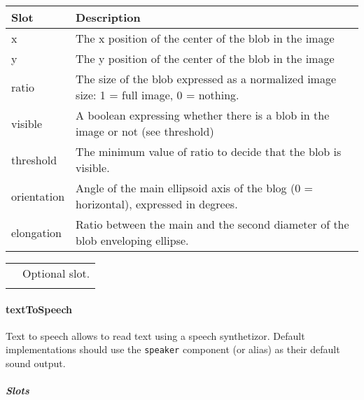 \documentclass[a4paper]{article}
\begin{document}
\begin{flushleft}
\tablehead{}
\begin{supertabular}{|m{3.293cm}|m{11.997cm}|}
\hline
\sffamily\bfseries Slot &
\sffamily\bfseries Description\\\hline
x &
\sffamily The x position of the center of the
blob in the image\\\hline
y &
\sffamily The y position of the center of the
blob in the image\\\hline
ratio &
\sffamily The size of the blob expressed as a
normalized image size: 1 = full image, 0 = nothing.\\\hline
visible &
\textsf{A boolean expressing whether there is a
blob in the image or not (see }threshold\textsf{)}\\\hline
threshold &
\textsf{The minimum value of }ratio\textsf{ to
decide that the blob is }visible\textsf{.}\\\hline
orientation &
\sffamily Angle of the main ellipsoid axis of
the blog (0 = horizontal), expressed in degrees.\\\hline
elongation &
\sffamily Ratio between the main and the second
diameter of the blob enveloping ellipse.\\\hline
\end{supertabular}
\end{flushleft}
\begin{flushleft}
\tablehead{}
\begin{supertabular}{|m{1.717cm}|m{10.464cm}}
\hhline{-~}
 &
\sffamily Optional slot.\\\hhline{-~}
\end{supertabular}
\end{flushleft}
\paragraph{textToSpeech}

{\sffamily
Text to speech allows to read text using a speech synthetizor. Default
implementations should use the \texttt{speaker} component (or alias) as
their default sound output.}

\subparagraph{Slots}
\end{document}

